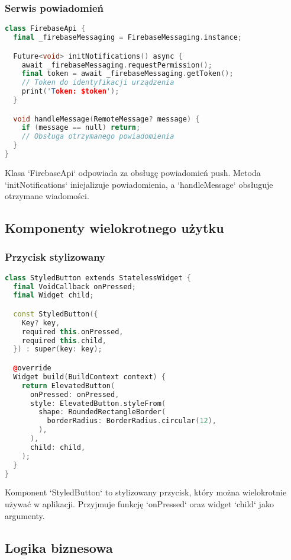 \subsubsection{Serwis powiadomień}
\begin{lstlisting}[language=C++, caption=Serwis powiadomień, label={lst:notification-service}]
class FirebaseApi {
  final _firebaseMessaging = FirebaseMessaging.instance;

  Future<void> initNotifications() async {
    await _firebaseMessaging.requestPermission();
    final token = await _firebaseMessaging.getToken();
    // Token do identyfikacji urządzenia
    print('Token: $token');
  }

  void handleMessage(RemoteMessage? message) {
    if (message == null) return;
    // Obsługa otrzymanego powiadomienia
  }
}
\end{lstlisting}
Klasa `FirebaseApi` odpowiada za obsługę powiadomień push. Metoda `initNotifications` inicjalizuje powiadomienia, a `handleMessage` obsługuje otrzymane wiadomości.

\subsection{Komponenty wielokrotnego użytku}

\subsubsection{Przycisk stylizowany}
\begin{lstlisting}[language=C++, caption=Komponent przycisku, label={lst:styled-button}]
class StyledButton extends StatelessWidget {
  final VoidCallback onPressed;
  final Widget child;

  const StyledButton({
    Key? key,
    required this.onPressed,
    required this.child,
  }) : super(key: key);

  @override
  Widget build(BuildContext context) {
    return ElevatedButton(
      onPressed: onPressed,
      style: ElevatedButton.styleFrom(
        shape: RoundedRectangleBorder(
          borderRadius: BorderRadius.circular(12),
        ),
      ),
      child: child,
    );
  }
}
\end{lstlisting}
Komponent `StyledButton` to stylizowany przycisk, który można wielokrotnie używać w aplikacji. Przyjmuje funkcję `onPressed` oraz widget `child` jako argumenty.

\subsection{Logika biznesowa}

